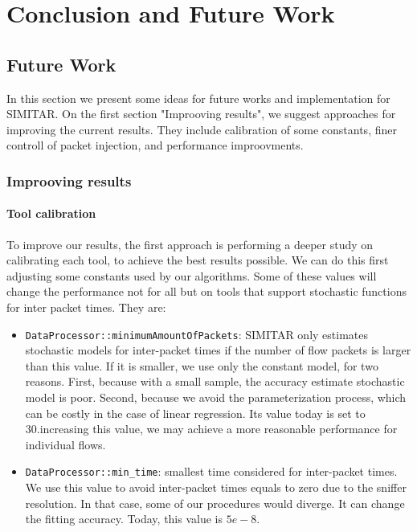 \chapter{Conclusion and Future Work}
\label{ch:conclusion}

\section{Future Work}

In this section we present some ideas for future works and implementation for SIMITAR. On the first section "Improoving results", we suggest approaches for improving the current results. They include calibration of some constants, finer controll of packet injection, and performance improovments. 

\subsection{Improoving results}

\subsubsection{Tool calibration}

To improve our results, the first approach is performing a deeper study on calibrating each tool, to achieve the best results possible. We can do this first adjusting some constants used by our algorithms. Some of these values will change the performance not for all but on tools that support stochastic functions for inter packet times. They are:

\begin{itemize}
	\item \texttt{DataProcessor::minimumAmountOfPackets}: SIMITAR only estimates stochastic models for inter-packet times if the number of flow packets is larger than this value. If it is smaller, we use only the constant model, for two reasons. First, because with a small sample, the accuracy estimate stochastic model is poor. Second, because we avoid the parameterization process, which can be costly in the case of linear regression. Its value today is set to 30.increasing this value, we may achieve a more reasonable performance for individual flows. 
	\item \texttt{DataProcessor::min\_time}: smallest time considered for inter-packet times. We use this value to avoid inter-packet times equals to zero due to the sniffer resolution. In that case, some of our procedures would diverge. It can change the fitting accuracy. Today, this value is $5e-8$. 
\end{itemize}

